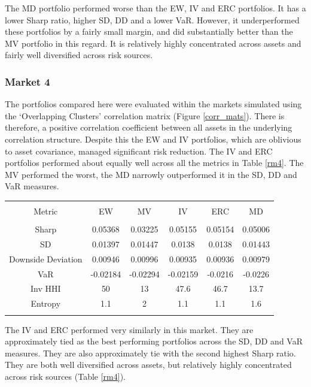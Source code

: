 \documentclass[11pt,preprint, authoryear]{elsarticle}
\let\origtable\table
\let\endorigtable\endtable
\renewenvironment{table}[1][2] {
    \expandafter\origtable\expandafter[H]
} {
    \endorigtable
}
\numberwithin{equation}{section}
\numberwithin{figure}{section}
\numberwithin{table}{section}
\begin{document}
The MD portfolio performed worse than the EW, IV and ERC portfolios. It
has a lower Sharp ratio, higher SD, DD and a lower VaR. However, it
underperformed these portfolios by a fairly small margin, and did
substantially better than the MV portfolio in this regard. It is
relatively highly concentrated across assets and fairly well diversified
across risk sources.

\hypertarget{market-4}{%
\subsubsection{Market 4}\label{market-4}}

The portfolios compared here were evaluated within the markets simulated
using the `Overlapping Clusters' correlation matrix (Figure
\ref{corr_mats}). There is therefore, a positive correlation coefficient
between all assets in the underlying correlation structure. Despite this
the EW and IV portfolios, which are oblivious to asset covariance,
managed significant risk reduction. The IV and ERC portfolios performed
about equally well across all the metrics in Table \ref{rm4}. The MV
performed the worst, the MD narrowly outperformed it in the SD, DD and
VaR measures.

\begin{table}[!htbp] \centering 
  \caption{Market 4 - Portfolio Risk Metrics} 
  \label{rm4} 
\begin{tabular}{@{\extracolsep{5pt}} cccccc} 
\\[-1.8ex]\hline 
\hline \\[-1.8ex] 
Metric & EW & MV & IV & ERC & MD \\ 
\hline \\[-1.8ex] 
Sharp & 0.05368 & 0.03225 & 0.05155 & 0.05154 & 0.05006 \\ 
SD & 0.01397 & 0.01447 & 0.0138 & 0.0138 & 0.01443 \\ 
Downside Deviation & 0.00946 & 0.00996 & 0.00935 & 0.00936 & 0.00979 \\ 
VaR & -0.02184 & -0.02294 & -0.02159 & -0.0216 & -0.0226 \\ 
Inv HHI & 50 & 13 & 47.6 & 46.7 & 13.7 \\ 
Entropy & 1.1 & 2 & 1.1 & 1.1 & 1.6 \\ 
\hline \\[-1.8ex] 
\end{tabular} 
\end{table}

The IV and ERC performed very similarly in this market. They are
approximately tied as the best performing portfolios across the SD, DD
and VaR measures. They are also approximately tie with the second
highest Sharp ratio. They are both well diversified across assets, but
relatively highly concentrated across risk sources (Table \ref{rm4}).
\end{document}
